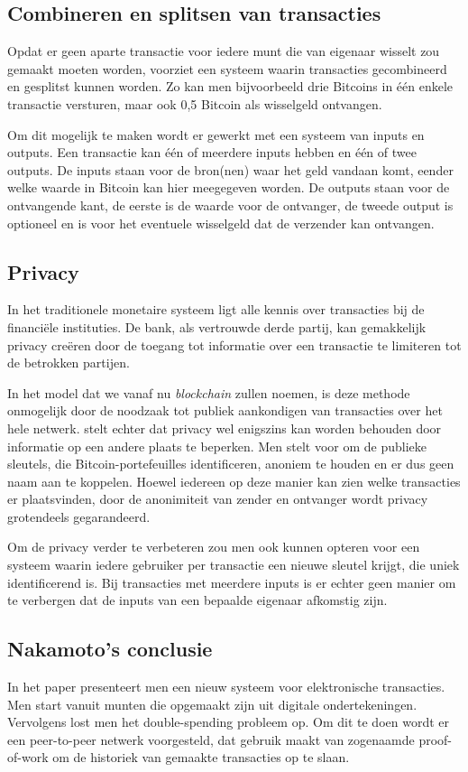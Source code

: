 	\subsection{Combineren en splitsen van transacties}
	Opdat er geen aparte transactie voor iedere munt die van eigenaar wisselt zou gemaakt moeten worden, voorziet \textcite{Nakamoto2008} een systeem waarin transacties gecombineerd en gesplitst kunnen worden. Zo kan men bijvoorbeeld drie Bitcoins in één enkele transactie versturen, maar ook 0,5 Bitcoin als wisselgeld ontvangen.
	
	Om dit mogelijk te maken wordt er gewerkt met een systeem van inputs en outputs. Een transactie kan één of meerdere inputs hebben en één of twee outputs. De inputs staan voor de bron(nen) waar het geld vandaan komt, eender welke waarde in Bitcoin kan hier meegegeven worden. De outputs staan voor de ontvangende kant, de eerste is de waarde voor de ontvanger, de tweede output is optioneel en is voor het eventuele wisselgeld dat de verzender kan ontvangen.~\autocite{Nakamoto2008}
	\subsection{Privacy}
	In het traditionele monetaire systeem ligt alle kennis over transacties bij de financiële instituties. De bank, als vertrouwde derde partij, kan gemakkelijk privacy creëren door de toegang tot informatie over een transactie te limiteren tot de betrokken partijen. ~\autocite{Nakamoto2008}
	
	In het model dat we vanaf nu \textit{blockchain} zullen noemen, is deze methode onmogelijk door de noodzaak tot publiek aankondigen van transacties over het hele netwerk.  \textcite{Nakamoto2008} stelt echter dat privacy wel enigszins kan worden behouden door informatie op een andere plaats te beperken. Men stelt voor om de publieke sleutels, die Bitcoin-portefeuilles identificeren, anoniem te houden en er dus geen naam aan te koppelen. Hoewel iedereen op deze manier kan zien welke transacties er plaatsvinden, door de anonimiteit van zender en ontvanger wordt privacy grotendeels gegarandeerd.~\autocite{Nakamoto2008}
	
	Om de privacy verder te verbeteren zou men ook kunnen opteren voor een systeem waarin iedere gebruiker per transactie een nieuwe sleutel krijgt, die uniek identificerend is. Bij transacties met meerdere inputs is er echter geen manier om te verbergen dat de inputs van een bepaalde eigenaar afkomstig zijn.~\autocite{Nakamoto2008}
	\subsection{Nakamoto’s conclusie}
	In het paper presenteert men een nieuw systeem voor elektronische transacties. Men start vanuit munten die opgemaakt zijn uit digitale ondertekeningen. Vervolgens lost men het double-spending probleem op. Om dit te doen wordt er een peer-to-peer netwerk voorgesteld, dat gebruik maakt van zogenaamde proof-of-work om de historiek van gemaakte transacties op te slaan.~\autocite{Nakamoto2008}
	
